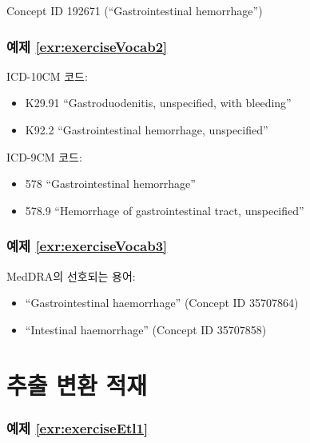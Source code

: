 \documentclass[11pt]{book}
\providecommand{\tightlist}{%
  \setlength{\itemsep}{0pt}\setlength{\parskip}{0pt}}
\theoremstyle{definition}
\theoremstyle{definition}
\theoremstyle{definition}
\theoremstyle{remark}
\begin{document}
Concept ID 192671 (``Gastrointestinal hemorrhage'')

\subsubsection*{예제
\ref{exr:exerciseVocab2}}\label{-refexrexercisevocab2}

ICD-10CM 코드:

\begin{itemize}
\tightlist
\item
  K29.91 ``Gastroduodenitis, unspecified, with bleeding''
\item
  K92.2 ``Gastrointestinal hemorrhage, unspecified''
\end{itemize}

ICD-9CM 코드:

\begin{itemize}
\tightlist
\item
  578 ``Gastrointestinal hemorrhage''
\item
  578.9 ``Hemorrhage of gastrointestinal tract, unspecified''
\end{itemize}

\subsubsection*{예제
\ref{exr:exerciseVocab3}}\label{-refexrexercisevocab3}

MedDRA의 선호되는 용어:

\begin{itemize}
\tightlist
\item
  ``Gastrointestinal haemorrhage'' (Concept ID 35707864)
\item
  ``Intestinal haemorrhage'' (Concept ID 35707858)
\end{itemize}

\section{추출 변환 적재}\label{Etlanswers}

\subsubsection*{예제 \ref{exr:exerciseEtl1}}\label{-refexrexerciseetl1}
\end{document}
